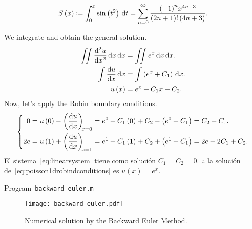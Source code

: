 \begin{equation*}
	S\left(x\right)\coloneqq
	\int_{0}^{x}\sin\left(t^{2}\right)\dl t=
	\sum_{n=0}^{\infty}
	\frac{{\left(-1\right)}^{n}x^{4n+3}}{\left(2n+1\right)!\left(4n+3\right)}.
\end{equation*}

We integrate and obtain the general solution.
\begin{align*}
	\iint
	\diff[2]{u}{x}
	\dl x
	\dl x           & =
	\iint
	e^{x}
	\dl x
	\dl x.              \\
	\int
	\diff{u}{x}
	\dl x           & =
	\int
	\left(e^{x}+C_{1}\right)
	\dl x.              \\
	u\left(x\right) & =
	e^{x}+C_{1}x+C_{2}.
\end{align*}
Now, let's apply the Robin boundary conditions.
\begin{equation}\label{eq:linearsystem}
	\left\{
	\begin{aligned}
		0
		 & =
		u\left(0\right)-
		\diff{u}{x}[x=0]=
		e^{0}+C_{1}\left(0\right)+C_{2}-
		\left(e^{0}+C_{1}\right)=
		C_{2}-C_{1}. \\
		2e
		 & =
		u\left(1\right)+
		\diff{u}{x}[x=1]=
		e^{1}+C_{1}\left(1\right)+C_{2}+
		\left(e^{1}+C_{1}\right)=
		2e+2C_{1}+C_{2}.
	\end{aligned}
	\right.
\end{equation}
El sistema~\eqref{eq:linearsystem} tiene como solución
$C_{1}=C_{2}=0$.
$\therefore$ la solución
de~\eqref{eq:poisson1drobindconditions} es
$u\left(x\right)=e^{x}$.

\begin{listing}[ht!]
	\tiny
	\centering
	\caption{Program~\texttt{backward\_euler.m}}
	\label{code:backward_euler.m}
\end{listing}

\begin{figure}[ht!]
	\centering
	\texttt{[image: backward\_euler.pdf]}
	\caption{Numerical solution by the Backward Euler Method.}
\end{figure}

